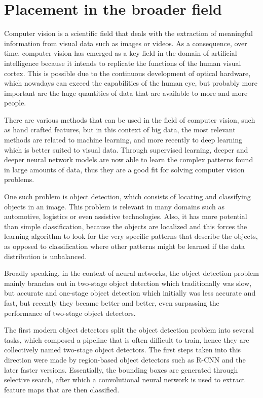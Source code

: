 \section{Placement in the broader field} \label{placement}

Computer vision is a scientific field that deals with the extraction of meaningful information from visual data such as images or videos. As a consequence, over time, computer vision has emerged as a key field in the domain of artificial intelligence because it intends to replicate the functions of the human visual cortex. This is possible due to the continuous development of optical hardware, which nowadays can exceed the capabilities of the human eye, but probably more important are the huge quantities of data that are available to more and more people.

There are various methods that can be used in the field of computer vision, such as hand crafted features, but in this context of big data, the most relevant methods are related to machine learning, and more recently to deep learning which is better suited to visual data. Through supervised learning, deeper and deeper neural network models are now able to learn the complex patterns found in large amounts of data, thus they are a good fit for solving computer vision problems.

One such problem is object detection, which consists of locating and classifying objects in an image. This problem is relevant in many domains such as automotive, logistics or even assistive technologies. Also, it has more potential than simple classification, because the objects are localized and this forces the learning algorithm to look for the very specific patterns that describe the objects, as opposed to classification where other patterns might be learned if the data distribution is unbalanced.

Broadly speaking, in the context of neural networks, the object detection problem mainly branches out in two-stage object detection which traditionally was slow, but accurate and one-stage object detection which initially was less accurate and fast, but recently they became better and better, even surpassing the performance of two-stage object detectors.

The first modern object detectors split the object detection problem into several tasks, which composed a pipeline that is often difficult to train, hence they are collectively named two-stage object detectors. The first steps taken into this direction were made by region-based object detectors such as R-CNN \cite{rcnn} and the later faster versions. Essentially, the bounding boxes are generated through selective search, after which a convolutional neural network is used to extract feature maps that are then classified.

